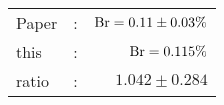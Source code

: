      \begin{tabular}{lcr}
          Paper &:& $\mathrm{Br}  = 0.11\pm 0.03\%$ \\
          this      &:& $\mathrm{Br}  = 0.115\%$ \\
		  ratio   &:& $1.042\pm 0.284$ \\
      \end{tabular}
